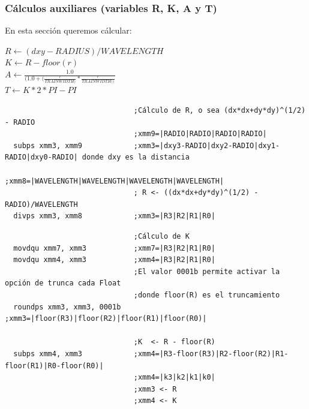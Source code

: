 \subsubsection*{Cálculos auxiliares (variables R, K, A y T)}

En esta sección queremos cálcular:

\begin{center}
	$R \gets (dxy-RADIUS)/WAVELENGTH$\\
	$K \gets R-floor(r)$ \\
	$A \gets \frac{1.0}{(1.0+(\frac{r}{TRAINWIDTH)}*\frac{r}{TRAINWIDTH))}}$ \\
	$T \gets K*2*PI-PI$
\end{center}

\begin{codesnippet}
\begin{verbatim}
                              ;Cálculo de R, o sea (dx*dx+dy*dy)^(1/2) - RADIO 
                              ;xmm9=|RADIO|RADIO|RADIO|RADIO|
  subps xmm3, xmm9            ;xmm3=|dxy3-RADIO|dxy2-RADIO|dxy1-RADIO|dxy0-RADIO| donde dxy es la distancia
                              ;xmm8=|WAVELENGTH|WAVELENGTH|WAVELENGTH|WAVELENGTH|
                              ; R <- ((dx*dx+dy*dy)^(1/2) - RADIO)/WAVELENGTH
  divps xmm3, xmm8            ;xmm3=|R3|R2|R1|R0|	
\end{verbatim}
\end{codesnippet}
\begin{codesnippet}
\begin{verbatim}
                              ;Cálculo de K
  movdqu xmm7, xmm3           ;xmm7=|R3|R2|R1|R0|
  movdqu xmm4, xmm3           ;xmm4=|R3|R2|R1|R0|
                              ;El valor 0001b permite activar la opción de trunca cada Float
                              ;donde floor(R) es el truncamiento
  roundps xmm3, xmm3, 0001b   ;xmm3=|floor(R3)|floor(R2)|floor(R1)|floor(R0)|

                              ;K  <- R - floor(R)
  subps xmm4, xmm3            ;xmm4=|R3-floor(R3)|R2-floor(R2)|R1-floor(R1)|R0-floor(R0)|								
                              ;xmm4=|k3|k2|k1|k0|
                              ;xmm3 <- R
                              ;xmm4 <- K
\end{verbatim}
\end{codesnippet}
